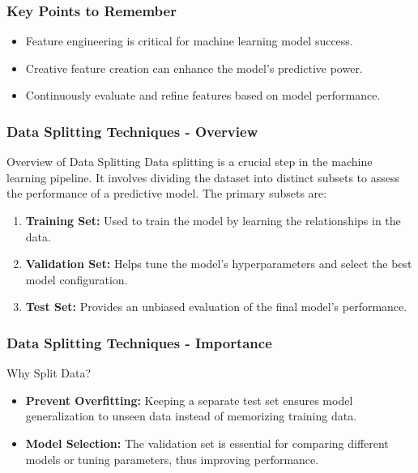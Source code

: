 \documentclass{beamer}
\begin{document}
\begin{frame}[fragile]
    \frametitle{Key Points to Remember}
    \begin{itemize}
        \item Feature engineering is critical for machine learning model success.
        \item Creative feature creation can enhance the model's predictive power.
        \item Continuously evaluate and refine features based on model performance.
    \end{itemize}
\end{frame}

\begin{frame}[fragile]
    \frametitle{Data Splitting Techniques - Overview}
    \begin{block}{Overview of Data Splitting}
        Data splitting is a crucial step in the machine learning pipeline. It involves dividing the dataset into distinct subsets to assess the performance of a predictive model. The primary subsets are:
    \end{block}
    \begin{enumerate}
        \item \textbf{Training Set:} Used to train the model by learning the relationships in the data.
        \item \textbf{Validation Set:} Helps tune the model's hyperparameters and select the best model configuration.
        \item \textbf{Test Set:} Provides an unbiased evaluation of the final model's performance.
    \end{enumerate}
\end{frame}

\begin{frame}[fragile]
    \frametitle{Data Splitting Techniques - Importance}
    \begin{block}{Why Split Data?}
        \begin{itemize}
            \item \textbf{Prevent Overfitting:} Keeping a separate test set ensures model generalization to unseen data instead of memorizing training data.
            \item \textbf{Model Selection:} The validation set is essential for comparing different models or tuning parameters, thus improving performance.
        \end{itemize}
    \end{block}
\end{frame}
\end{document}
